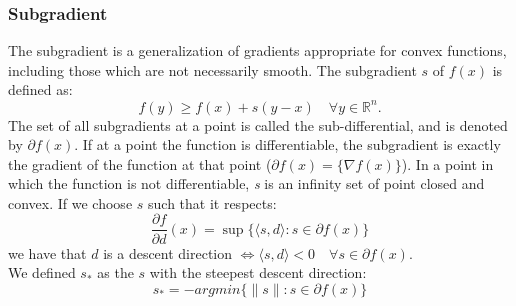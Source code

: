 \subsubsection{Subgradient}
The subgradient is a generalization of gradients appropriate for convex functions, including those which are not necessarily smooth.
The subgradient $s$ of $f(x)$ is defined as:
\begin{equation}
f(y) \geq f(x) +s(y-x) \quad \forall y \in \mathbb{R}^n.
\end{equation}
The set of all subgradients at a point is called the sub-differential, and is denoted by $\partial f(x)$. 
If at a point the function is differentiable, the subgradient is exactly the gradient of the function at that point ($\partial f(x)= \{\nabla f(x) \}$).
In a point in which the function is not differentiable, \textit{s} is an infinity set of point closed and convex.
If we choose $s$ such that it respects:
\begin{equation}
\frac{\partial f}{\partial d}(x)=\sup\{\langle s,d \rangle : s \in \partial f(x)\} 
\end{equation} 
we have that $d$ is a descent direction $\iff \langle s,d\rangle <0 \quad \forall s \in \partial f(x)$.
\\ We defined $s_*$ as the $s$ with the steepest descent direction:
\begin{equation}
s_*= -argmin\{\parallel s\parallel : s\in \partial f(x) \}
\end{equation} 
